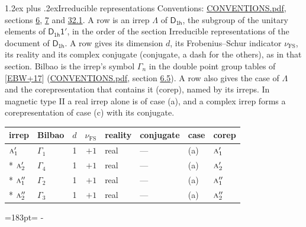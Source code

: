 \documentclass[10pt,a4paper]{article}
\makeatletter
\renewcommand\section{\@startsection{section}{1}{\z@}{-3ex plus -1ex minus -.2ex}%
  {1.2ex plus .2ex}{\normalfont\large\sffamily\bfseries\color{parttitle}}}
\newcommand{\needspace}[1]{\par\penalty-100\begingroup\dimen0=#1\relax\dimen2=\pagegoal
  \advance\dimen2-\pagetotal\ifdim\dimen0>\dimen2\relax\ifdim\dimen2>0pt\vfil\break\fi\fi
  \endgroup}
\numberwithin{equation}{section}
\newcommand{\grp}[1]{\mathsf{#1}}
\newcommand{\irr}[1]{\text{\normalfont\scshape #1}}
\newcommand{\fsind}{\nu_{\mathrm{FS}}}
\makeatother
\begin{document}
\section{Irreducible representations}\label{s:irreps}
Conventions: \href{../../CONVENTIONS.pdf}{CONVENTIONS.pdf}, sections \href{../../../rotation/CONVENTIONS.pdf\#conv.6}{6}, \href{../../../rotation/CONVENTIONS.pdf\#conv.7}{7} and \href{../../CONVENTIONS.pdf\#conv.32.1}{32.1}.
\leavevmode\label{n:irrep.Delta}A row is an irrep $\Lambda$ of $\grp{D_{1h}}$, the subgroup of the unitary elements of $\grp{D_{1h}1'}$, in the order of the section Irreducible representations of the document of \href{../../../rotation/data/pdf/D1h.pdf}{$\grp{D_{1h}}$}. \label{n:index.dimension}\label{n:index.frobenius}\label{n:head.irrep}\label{n:head.reality}\label{n:head.conjugate}A row gives its dimension $d$, its Frobenius--Schur indicator $\fsind$, its reality and its complex conjugate (conjugate, a dash for the others), as in that section. \label{n:head.bilbao}\label{n:irrep.alias.gamma}Bilbao is the irrep's symbol $\Gamma_n$ in the double point group tables of [\href{../../../REFERENCES.pdf\#ref.EBW+17}{EBW+17}] (\href{../../CONVENTIONS.pdf}{CONVENTIONS.pdf}, section \href{../../../rotation/CONVENTIONS.pdf\#conv.6.5}{6.5}). \label{n:head.case.corep}\label{n:head.corep}A row also gives the case of $\Lambda$ and the corepresentation that contains it (corep), named by its irreps. In magnetic type II a real irrep alone is of case (a), and a complex irrep forms a corepresentation of case (c) with its conjugate.
\setlength{\emergencystretch}{2em}\par\setlength{\emergencystretch}{0pt}
{\small\renewcommand{\arraystretch}{1.25}\setlength{\tabcolsep}{4pt}\begin{longtable}{@{}llrrllll@{}}\toprule
irrep & Bilbao & $d$ & $\fsind$ & reality & conjugate & case & corep\\\midrule\endhead
\bottomrule\endfoot\endlastfoot
$\irr{a}_{1}'$ & $\Gamma_{1}$ & 1 & $+1$ & real & --- & (a) & $\irr{a}_{1}'$\\*
$\irr{a}_{2}'$ & $\Gamma_{4}$ & 1 & $+1$ & real & --- & (a) & $\irr{a}_{2}'$\\*
$\irr{a}_{1}''$ & $\Gamma_{2}$ & 1 & $+1$ & real & --- & (a) & $\irr{a}_{1}''$\\*
$\irr{a}_{2}''$ & $\Gamma_{3}$ & 1 & $+1$ & real & --- & (a) & $\irr{a}_{2}''$\\
\bottomrule\end{longtable}}
\needspace{183pt}
\end{document}

